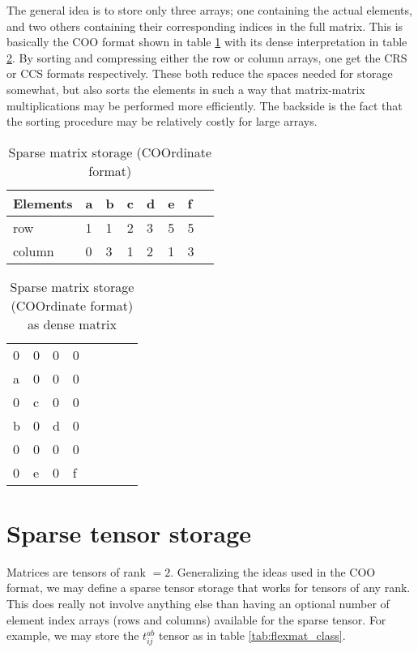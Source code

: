 The general idea is to store only three arrays; one containing the actual elements, and two others containing their corresponding indices in the full matrix. This is basically the COO format shown in table \ref{tab:coo_storage} with its dense interpretation in table \ref{tab:coo_storageII}. By sorting and compressing either the row or column arrays, one get the CRS or CCS formats respectively. These both reduce the spaces needed for storage somewhat, but also sorts the elements in such a way that matrix-matrix multiplications may be performed more efficiently. The backside is the fact that the sorting procedure may be relatively costly for large arrays.

\begin{table}[hbtp]
\centering
\caption{Sparse matrix storage (COOrdinate format)}
\label{tab:coo_storage}
\begin{tabular}{llllllll}
Elements & a & b & c & d & e & f \\ \hline
row          & 1 & 1 & 2 & 3 & 5 & 5 \\ \hline 
column    & 0 & 3 & 1 & 2 & 1 & 3 \\ \hline
\end{tabular}
\end{table}

\begin{table}[hbtp]
\centering
\caption{Sparse matrix storage (COOrdinate format) as dense matrix}
\label{tab:coo_storageII}
\begin{tabular}{llllllll}
0 & 0&0 &0 &  \\
a&0 &0 &0 &  \\
0 &c&0 &0 &  \\
b&0 &d&0 & \\
0 &0  & 0 &0 & \\
0 &e& 0 &f& \\
\end{tabular}
\end{table}

\section{Sparse tensor storage}

Matrices are tensors of rank $=2$. Generalizing the ideas used in the COO format, we may define a sparse tensor storage that works for tensors of any rank. This does really not involve anything else than having an optional number of element index arrays (rows and columns) available for the sparse tensor. For example, we may store the $t^{ab}_{ij}$ tensor as in table \ref{tab:flexmat_class}.

